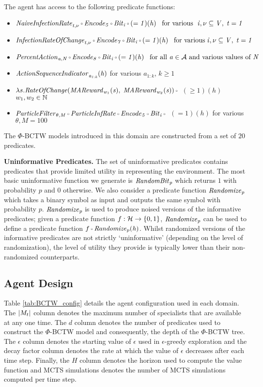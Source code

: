 The agent has access to the following predicate functions:
\begin{itemize}
    \item $\it{NaiveInfectionRate}_{t, \nu} \comp \it{Encode}_5  \comp \it{Bit}_i \comp (=1) (h) \;\;\; \text{for various } \;i, \nu \subseteq V, \; t = 1$
    \item $\it{InfectionRateOfChange}_{t, \nu} \comp  \it{Encode}_{7}  \comp \it{Bit}_i \comp (=1) (h) \;\;\; \text{for various} \;i, \nu \subseteq V, \; t = 1$
    \item $\it{PercentAction}_{a, N} \comp \it{Encode}_{8}  \comp \it{Bit}_i \comp (=1) (h) \;\;\; \text{for all } a \in \A  \text{ and various values of } N$
    \item $\it{ActionSequenceIndicator}_{a_{1:k}}(h)$ for various $a_{1:k}$, 
 ${k \geq 1}$
    \item $\lambda s.\it{RateOfChange}(\it{MAReward}_{w_1}(s), $ $\it{MAReward}_{w_2}(s)) \comp $ ${( \geq 1) (h)}$  $w_1, w_2 \in \mathbb{N}$
    \item $\it{ParticleFilter}_{\theta, M} \comp \it{ParticleInfRate} \comp \it{Encode}_5  \comp \it{Bit}_i \comp$ ${(=1)(h)}$ for various $\theta, M = 100$
\end{itemize}

The $\Phi$-BCTW models introduced in this domain are constructed from a set of $20$ predicates. 

\textbf{Uninformative Predicates.}
The set of uninformative predicates contains predicates that provide limited utility in representing the environment. The most basic uninformative function we generate is $\it{RandomBit}_{p}$ which returns $1$ with probability $p$ and $0$ otherwise. We also consider a predicate function $\it{Randomize}_{p}$ which takes a binary symbol as input and outputs the same symbol with probability $p$. $\it{Randomize}_{p}$ is used to produce noised versions of the informative predicates; given a predicate function $f: \mathcal{H} \to \{0, 1\}$, $\it{Randomize}_{p}$ can be used to define a predicate function $f \comp \it{Randomize}_{p}(h)$. Whilst randomized versions of the informative predicates are not strictly `uninformative' (depending on the level of randomization), the level of utility they provide is typically lower than their non-randomized counterparts. 


\subsection{Agent Design}
Table \ref{tab:BCTW_config} details the agent configuration used in each domain. The $\lvert M_t \rvert$ column denotes the maximum number of specialists that are available at any one time. 
The $d$ column denotes the number of predicates used to construct the $\Phi$-BCTW model and consequently, the depth of the $\Phi$-BCTW tree. 
The $\epsilon$ column denotes the starting value of $\epsilon$ used in $\epsilon$-greedy exploration and the decay factor column denotes the rate at which the value of $\epsilon$ decreases after each time step. 
Finally, the $H$ column denotes the horizon used to compute the value function and MCTS simulations denotes the number of MCTS simulations computed per time step.

